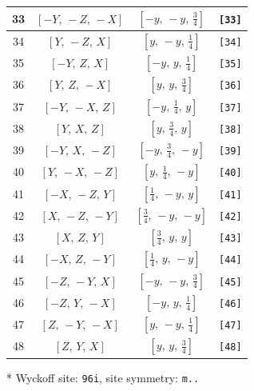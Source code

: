 \documentclass[fleqn,8pt]{jsarticle}
\begin{document}
\begin{longtable}{cccc}
33 & $\left[ - Y,\, - Z,\, - X \right]$ & $\left[ - y,\, - y,\, \frac{3}{4} \right]$ & {\tt [33]} \\ \hline
34 & $\left[ Y,\, - Z,\, X \right]$ & $\left[ y,\, - y,\, \frac{1}{4} \right]$ & {\tt [34]} \\ \hline
35 & $\left[ - Y,\, Z,\, X \right]$ & $\left[ - y,\, y,\, \frac{1}{4} \right]$ & {\tt [35]} \\ \hline
36 & $\left[ Y,\, Z,\, - X \right]$ & $\left[ y,\, y,\, \frac{3}{4} \right]$ & {\tt [36]} \\ \hline
37 & $\left[ - Y,\, - X,\, Z \right]$ & $\left[ - y,\, \frac{1}{4},\, y \right]$ & {\tt [37]} \\ \hline
38 & $\left[ Y,\, X,\, Z \right]$ & $\left[ y,\, \frac{3}{4},\, y \right]$ & {\tt [38]} \\ \hline
39 & $\left[ - Y,\, X,\, - Z \right]$ & $\left[ - y,\, \frac{3}{4},\, - y \right]$ & {\tt [39]} \\ \hline
40 & $\left[ Y,\, - X,\, - Z \right]$ & $\left[ y,\, \frac{1}{4},\, - y \right]$ & {\tt [40]} \\ \hline
41 & $\left[ - X,\, - Z,\, Y \right]$ & $\left[ \frac{1}{4},\, - y,\, y \right]$ & {\tt [41]} \\ \hline
42 & $\left[ X,\, - Z,\, - Y \right]$ & $\left[ \frac{3}{4},\, - y,\, - y \right]$ & {\tt [42]} \\ \hline
43 & $\left[ X,\, Z,\, Y \right]$ & $\left[ \frac{3}{4},\, y,\, y \right]$ & {\tt [43]} \\ \hline
44 & $\left[ - X,\, Z,\, - Y \right]$ & $\left[ \frac{1}{4},\, y,\, - y \right]$ & {\tt [44]} \\ \hline
45 & $\left[ - Z,\, - Y,\, X \right]$ & $\left[ - y,\, - y,\, \frac{3}{4} \right]$ & {\tt [45]} \\ \hline
46 & $\left[ - Z,\, Y,\, - X \right]$ & $\left[ - y,\, y,\, \frac{1}{4} \right]$ & {\tt [46]} \\ \hline
47 & $\left[ Z,\, - Y,\, - X \right]$ & $\left[ y,\, - y,\, \frac{1}{4} \right]$ & {\tt [47]} \\ \hline
48 & $\left[ Z,\, Y,\, X \right]$ & $\left[ y,\, y,\, \frac{3}{4} \right]$ & {\tt [48]} \\
\end{longtable}
* Wyckoff site: {\tt 96i}, site symmetry: {\tt m..}
\renewcommand{\arraystretch}{1.2}
\end{document}
